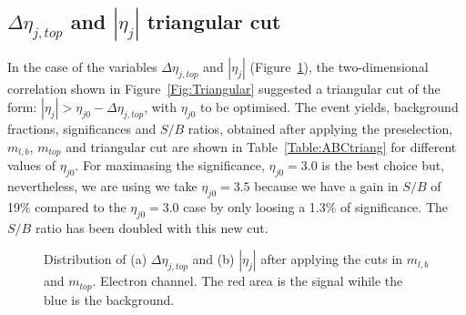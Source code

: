 \subsection{\boldmath$\Delta \eta_{j,top}$ and \boldmath$|\eta_j|$ triangular cut}
In the case of the variables $\Delta \eta_{j,top}$ and $|\eta_j|$ (Figure~\ref{Fig:Detajt&etaj}), the two-dimensional correlation shown in Figure~\ref{Fig:Triangular} suggested a triangular cut of the form: $|\eta_j| > \eta_{j0} - \Delta\eta_{j,top}$, with $\eta_{j0}$ to be optimised. The event yields, background fractions, significances and $S/B$ ratios, obtained after applying the preselection, $m_{l,b}$, $m_{top}$ and triangular cut are shown in Table~\ref{Table:ABCtriang} for different values of $\eta_{j0}$. For maximasing the significance, $\eta_{j0}=3.0$ is the best choice but, nevertheless, we are using we take $\eta_{j0}=3.5$ because we have a gain in $S/B$ of 19\% compared to the $\eta_{j0}=3.0$ case by only loosing a 1.3\% of significance. The $S/B$ ratio has been doubled with this new cut.


\begin{figure}[h]
\centering
{}
\caption{Distribution of (a) $\Delta \eta_{j,top}$ and (b) $|\eta_j|$ after applying the cuts in $m_{l,b}$ and $m_{top}$. Electron channel. The red area is the signal wihile the blue is the background.} 
\label{Fig:Detajt&etaj}
\end{figure}

